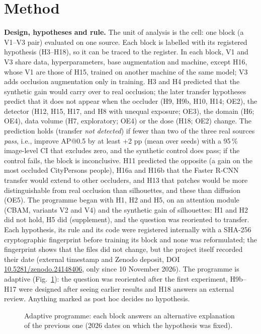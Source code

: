 \documentclass[conference]{IEEEtran}
\begin{document}
\section{Method}
\textbf{Design, hypotheses and rule.} The unit of analysis is the cell: one block (a V1--V3 pair) evaluated on one source. Each block is labelled with its registered hypothesis (H3--H18), so it can be traced to the register. In each block, V1 and V3 share data, hyperparameters, base augmentation and machine, except H16, whose V1 are those of H15, trained on another machine of the same model; V3 adds occlusion augmentation only in training. H3 and H4 predicted that the synthetic gain would carry over to real occlusion; the later transfer hypotheses predict that it does not appear when the occluder (H9, H9b, H10, H14; OE2), the detector (H12, H15, H17, and H8 with unequal exposure; OE3), the domain (H6; OE4), data volume (H7, exploratory; OE4) or the dose (H18; OE2) change. The prediction holds (transfer \emph{not detected}) if fewer than two of the three real sources \emph{pass}, i.e., improve AP@0.5 by at least +2 pp (mean over seeds) with a 95\,\% image-level CI that excludes zero, and the synthetic control does pass; if the control fails, the block is inconclusive. H11 predicted the opposite (a gain on the most occluded CityPersons people), H16a and H16b that the Faster R-CNN transfer would extend to other occluders, and H13 that patches would be more distinguishable from real occlusion than silhouettes, and these than diffusion (OE5). The programme began with H1, H2 and H5, on an attention module (CBAM, variants V2 and V4) and the synthetic gain of silhouettes: H1 and H2 did not hold, H5 did (supplement), and the question was reoriented to transfer. Each hypothesis, its rule and its code were registered internally with a SHA-256 cryptographic fingerprint before training its block and none was reformulated; the fingerprint shows that the files did not change, but the project itself recorded their date (external timestamp and Zenodo deposit, DOI \href{https://doi.org/10.5281/zenodo.24148406}{\mbox{10.5281/zenodo.24148406}}, only since 10 November 2026). The programme is adaptive (Fig.~\ref{fig:prog}): the question was reoriented after the first experiment, H9b--H17 were designed after seeing earlier results and H18 answers an external review. Anything marked as post hoc decides no hypothesis.

\begin{figure}[t]
\centering

\caption{Adaptive programme: each block answers an alternative explanation of the previous one (2026 dates on which the hypothesis was fixed).}
\label{fig:prog}
\end{figure}
\end{document}
